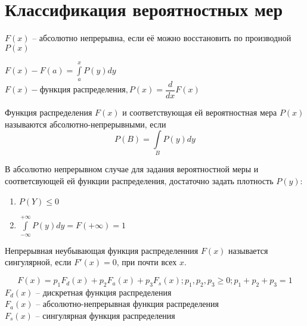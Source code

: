 \section{Классификация вероятностных мер}

\begin{definition}
  $F(x)$ -- абсолютно непрерывна, если её можно восстановить по производной $P(x)$
\end{definition}

\begin{example}
  $F(x) - F(a) = \int\limits_a^x P(y) dy$\\
  $F(x) - \text{функция распределения}, P(x) = \dfrac{d}{dx}F(x)$
\end{example}

\begin{definition}
  Функция распределения $F(x)$ и соответствующая ей вероятностная мера $P(x)$ называются абсолютно-непрерывными, если $$P(B)=\int\limits_B P(y)dy$$
\end{definition}

В абсолютно непрерывном случае для задания вероятностной меры и соответсвующей ей функции распределения, достаточно задать плотность $P(y)$:
\begin{enumerate}
  \item $P(Y) \leq 0$
  \item $\int\limits_{-\infty}^{+\infty}P(y) dy = F(+\infty) = 1$
\end{enumerate}

\begin{definition}
  Непрерывная неубывающая функция распределенния $F(x)$ называется сингулярной, если $F'(x)=0$, при почти всех $x$.
\end{definition}

\begin{theorem}
  $$F(x)=p_1 F_d (x)+p_2 F_a (x)+p_3 F_s (x); p_1, p_2, p_3 \geq 0; p_1+p_2+p_3 = 1$$
  $F_d (x)$ -- дискретная функция распределения\\
  $F_a (x)$ -- абсолютно-непрерывная функция распределения\\
  $F_s (x)$ -- сингулярная функция распределения
\end{theorem}
